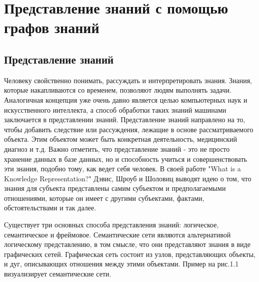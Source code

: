 \chapter{Представление знаний с помощью графов знаний} \label{ch1}



\section{Представление знаний}

Человеку свойственно понимать, рассуждать и интерпретировать знания. Знания, которые накапливаются со временем, позволяют людям выполнять задачи. Аналогичная концепция уже очень давно является целью компьютерных наук и искусственного интеллекта, а способ обработки таких знаний машинами заключается в представлении знаний. Представление знаний направлено на то, чтобы добавить следствие или рассуждения, лежащие в основе рассматриваемого объекта. Этим объектом может быть конкретная деятельность, медицинский диагноз и т.д. Важно отметить, что представление знаний - это не просто хранение данных в базе данных, но и способность учиться и совершенствовать эти знания, подобно тому, как ведет себя человек. В своей работе "What is a Knowledge Representation?" Дэвис, Шроуб и Шоловиц выводят идею о том, что знания для субъекта представлены самим субъектом и предполагаемыми отношениями, которые он имеет с другими субъектами, фактами, обстоятельствами и так далее.

Существует три основных способа представления знаний: логическое, семантическое и фреймовое. Семантические сети являются альтернативой логическому представлению, в том смысле, что они представляют знания в виде графических сетей. Графическая сеть состоит из узлов, представляющих объекты, и дуг, описывающих отношения между этими объектами. Пример на рис.1.1 визуализирует семантические сети.

